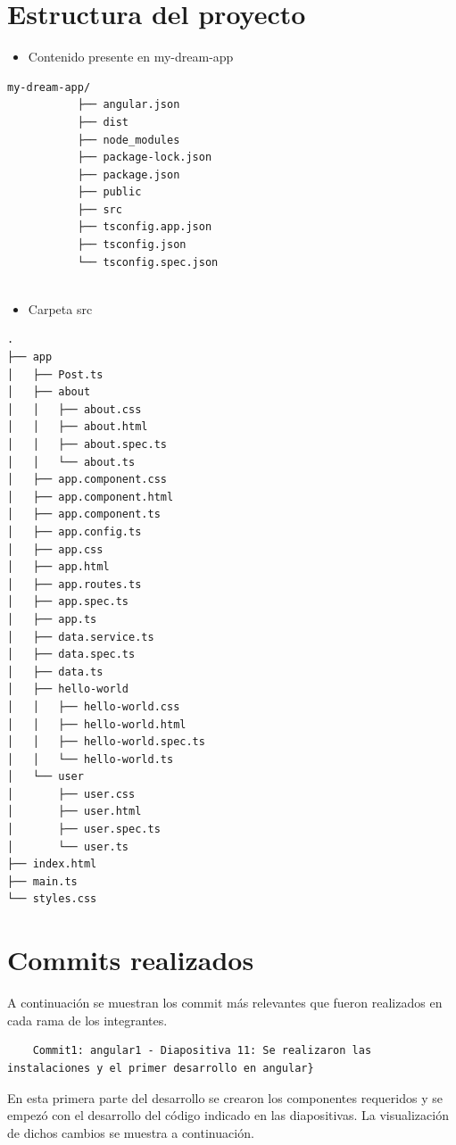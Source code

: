 \documentclass{article}
\begin{document}
	\section{Estructura del proyecto}
	
	\begin{itemize}	
		\item Contenido presente en my-dream-app
	\end{itemize}
	
	\begin{lstlisting}[style=ascii-tree]
		my-dream-app/
           ├── angular.json
           ├── dist
           ├── node_modules
           ├── package-lock.json
           ├── package.json
           ├── public
           ├── src
           ├── tsconfig.app.json
           ├── tsconfig.json
           └── tsconfig.spec.json
		
	\end{lstlisting}

\begin{itemize}	
		\item Carpeta src
	\end{itemize}

\begin{lstlisting}[style=ascii-tree]
.
├── app
│   ├── Post.ts
│   ├── about
│   │   ├── about.css
│   │   ├── about.html
│   │   ├── about.spec.ts
│   │   └── about.ts
│   ├── app.component.css
│   ├── app.component.html
│   ├── app.component.ts
│   ├── app.config.ts
│   ├── app.css
│   ├── app.html
│   ├── app.routes.ts
│   ├── app.spec.ts
│   ├── app.ts
│   ├── data.service.ts
│   ├── data.spec.ts
│   ├── data.ts
│   ├── hello-world
│   │   ├── hello-world.css
│   │   ├── hello-world.html
│   │   ├── hello-world.spec.ts
│   │   └── hello-world.ts
│   └── user
│       ├── user.css
│       ├── user.html
│       ├── user.spec.ts
│       └── user.ts
├── index.html
├── main.ts
└── styles.css
\end{lstlisting}

    

        \section{Commits realizados}

        A continuación se muestran los commit más relevantes que fueron realizados en cada rama de los integrantes. 

	
        
    \begin{lstlisting}
    Commit1: angular1 - Diapositiva 11: Se realizaron las instalaciones y el primer desarrollo en angular}
\end{lstlisting}
En esta primera parte del desarrollo se crearon los componentes requeridos y se empezó con el desarrollo del código indicado en las diapositivas. La visualización de dichos cambios se muestra a continuación. 
\end{document}

